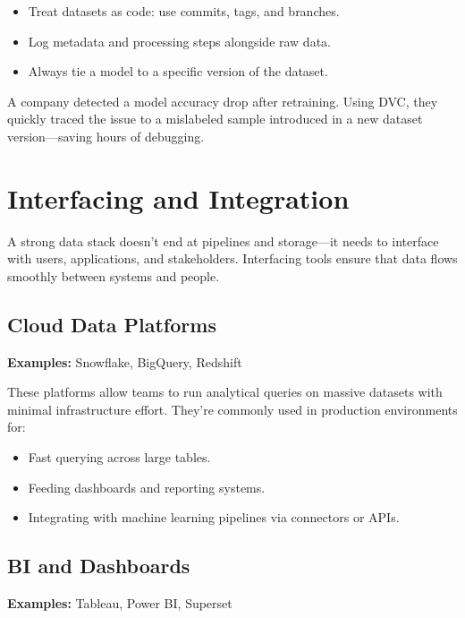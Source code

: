 \documentclass[12pt,openany, draft]{book}
\begin{document}
\begin{itemize}
    \item Treat datasets as code: use commits, tags, and branches.
    \item Log metadata and processing steps alongside raw data.
    \item Always tie a model to a specific version of the dataset.
\end{itemize}

\begin{examplebox}
A company detected a model accuracy drop after retraining. Using DVC, they quickly traced the issue to a mislabeled sample introduced in a new dataset version—saving hours of debugging.
\end{examplebox}


\section{Interfacing and Integration}

A strong data stack doesn’t end at pipelines and storage—it needs to interface with users, applications, and stakeholders. Interfacing tools ensure that data flows smoothly between systems and people.

\subsection*{Cloud Data Platforms}

\textbf{Examples:} Snowflake, BigQuery, Redshift \newline

These platforms allow teams to run analytical queries on massive datasets with minimal infrastructure effort. They're commonly used in production environments for:

\begin{itemize}
    \item Fast querying across large tables.
    \item Feeding dashboards and reporting systems.
    \item Integrating with machine learning pipelines via connectors or APIs.
\end{itemize}

\subsection*{BI and Dashboards}

\textbf{Examples:} Tableau, Power BI, Superset \newline
\end{document}
